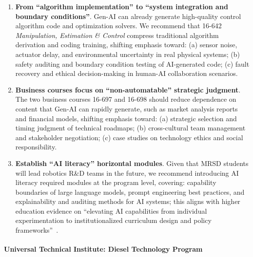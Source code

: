 \begin{enumerate}[label=\roman*.]
    \item \textbf{From ``algorithm implementation'' to ``system integration and boundary conditions''}. Gen-AI can already generate high-quality control algorithm code and optimization solvers. We recommend that 16-642 \textit{Manipulation, Estimation \& Control} compress traditional algorithm derivation and coding training, shifting emphasis toward: (a) sensor noise, actuator delay, and environmental uncertainty in real physical systems; (b) safety auditing and boundary condition testing of AI-generated code; (c) fault recovery and ethical decision-making in human-AI collaboration scenarios.
    \item \textbf{Business courses focus on ``non-automatable'' strategic judgment}. The two business courses 16-697 and 16-698 should reduce dependence on content that Gen-AI can rapidly generate, such as market analysis reports and financial models, shifting emphasis toward: (a) strategic selection and timing judgment of technical roadmaps; (b) cross-cultural team management and stakeholder negotiation; (c) case studies on technology ethics and social responsibility.
    \item \textbf{Establish ``AI literacy'' horizontal modules}. Given that MRSD students will lead robotics R\&D teams in the future, we recommend introducing AI literacy required modules at the program level, covering: capability boundaries of large language models, prompt engineering best practices, and explainability and auditing methods for AI systems; this aligns with higher education evidence on ``elevating AI capabilities from individual experimentation to institutionalized curriculum design and policy frameworks''~\citep{jogezai2025generativeartifici,wong2025thefutureoflearnin}.
\end{enumerate}

\paragraph{Universal Technical Institute: Diesel Technology Program}

